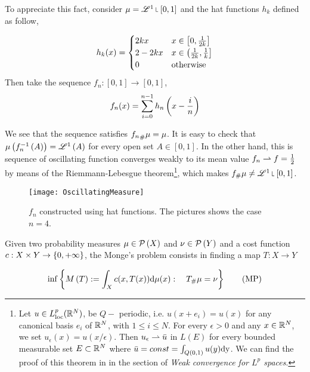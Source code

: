 To appreciate this fact, consider $\mu = \Lebesgue^1\measurerestr[0,1]$ and the hat functions $h_k$ defined as follow,

\begin{equation*}
	h_k(x)=\begin{cases}
		2kx & x\in\left[ 0, \frac{1}{2k} \right]\\
		2-2kx & x\in \left(\frac{1}{2k}, \frac{1}{k}\right] \\
		0 & \text{otherwise}
	\end{cases}
\end{equation*}
Then take the sequence $f_n:[0,1]\rightarrow [0,1]$,
\begin{equation}
	f_n(x)=\sum_{i=0}^{n-1}h_n\left( x-\frac{i}{n} \right)
\end{equation}


We see that the sequence satisfies ${f_{n}}_{\#} \mu=\mu$. It is easy to check that $\mu\left( f_n^{-1}\left(A\right) \right)=\mathscr{L}^1\left( A \right)$ for every open set $A\in [0,1]$. In the other hand, this is sequence of oscillating function converges weakly to its mean value $f_n\rightharpoonup f=\frac{1}{2}$ by means of the Riemmann-Lebesgue theorem\footnote{Let $u\in L^p_{\mathrm{loc}}(\mathbb{R}^N)$, be $Q-$ periodic, i.e. $u(x+e_i)=u(x)$ for any canonical basis $e_i$ of $\mathbb{R}^N$, with $1\leq i\leq N$. For every $\epsilon>0$ and any $x\in\mathbb{R}^N$, we set $u_\epsilon(x)=u(x/\epsilon)$. Then $u_\epsilon\rightharpoonup \bar{u}$ in $L(E)$ for every bounded measurable set $E\subset \mathbb{R}^N$ where $\bar{u}=const=\int_{Q(0,1)}u(y)\mathrm{dy}$. We can find the proof of this theorem in \cite{Fonseca2007ModCalculculusofVar} in the section of \emph{Weak convergence for $L^p$ spaces}.}, which makes $\Tmeasure{\mu}{f}\neq\Lebesgue^1\measurerestr [0,1]$.
\begin{figure}[H]
	\begin{center}
\texttt{[image: OscillatingMeasure]}
\caption{$f_n$ constructed using hat functions. The pictures shows the case $n=4$.}
	\end{center}
\end{figure}

\begin{problem} Given two probability measures $\mu \in \mathcal{P}\left( X \right)$ and $\nu \in \mathcal{P}\left( Y \right)$ and a cost function $c: X \times Y \rightarrow \left\lbrace 0, +\infty \right\rbrace$, the Monge's problem consists in finding a map $T:X\rightarrow Y$
	
\begin{equation}
\inf\left\lbrace M\left(T\right):=\int_X c(x, T(x)) \mathrm{d} \mu(x): \quad {T}_{\#} \mu=\nu  \right\rbrace\label{eq: Monge's Problem.}\tag{MP}
\end{equation}
\end{problem}

